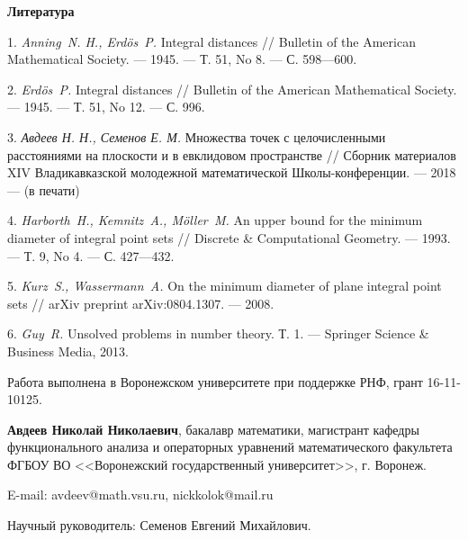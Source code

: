 \documentclass[12pt]{article}
\begin{document}
\bigskip\centerline{\bf Литература}



1.	\emph{Anning~N. H., Erd\"{o}s~P.}
	Integral distances // Bulletin of the American Mathematical
	Society. --- 1945. --- Т. 51, No 8. --- С. 598---600.

2.	\emph{Erd\"{o}s~P.} Integral distances // Bulletin of the
	American Mathematical Society. --- 1945. --- Т. 51, No 12. --- С. 996.

3.	\emph{Авдеев Н. Н., Семенов Е. М.}
	Множества точек с целочисленными расстояниями на плоскости и в евклидовом пространстве
	//
	Сборник материалов XIV Владикавказской молодежной математической Школы-конференции.
	--- 2018 --- (в печати)

4.	\emph{Harborth~H.,
	Kemnitz~A.,
	M\"{o}ller~M.}
	An upper bound for the minimum diameter of integral point sets
	/\!/ Discrete \& Computational Geometry. --- 1993. --- Т. 9, No 4.
	--- С. 427---432.

5.	\emph{Kurz~S., Wassermann~A.}
	On the minimum diameter of plane integral point sets /\!/ arXiv
	preprint arXiv:0804.1307. --- 2008.

6.	\emph{Guy~R.} Unsolved problems in number theory. Т.
	1. --- Springer Science \& Business Media, 2013.

{\small Работа выполнена в Воронежском университете при поддержке РНФ, грант 16-11-10125.}


{\bf Авдеев Николай Николаевич},
бакалавр математики, магистрант кафедры функционального анализа и операторных уравнений математического факультета
ФГБОУ ВО <<Воронежский государственный университет>>, г. Воронеж.

E-mail: avdeev@math.vsu.ru, nickkolok@mail.ru

Научный руководитель: Семенов Евгений Михайлович.
\end{document}

